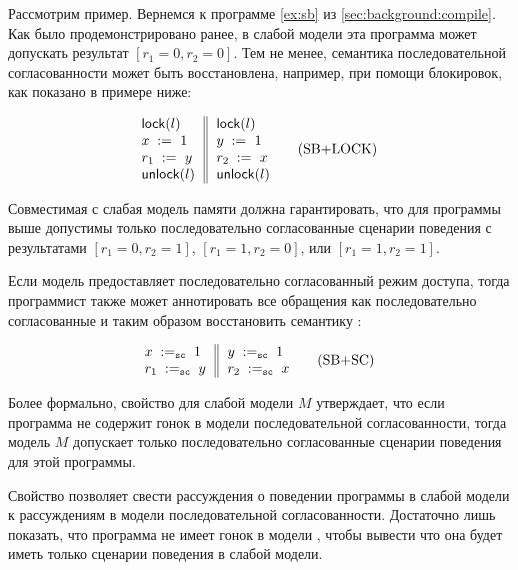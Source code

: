 Рассмотрим пример. 
Вернемся к программе \ref{ex:sb} из \cref{sec:background:compile}.
Как было продемонстрировано ранее, в слабой модели 
эта программа может допускать результат ${[r_1=0, r_2=0]}$.
Тем не менее, семантика последовательной согласованности
может быть восстановлена, например, при помощи блокировок, 
как показано в примере ниже:

\begin{equation*}
\inarrII{
   \lockInst{l}         \\
   \writeInst{}{x}{1}   \\
   \readInst{}{r_1}{y}  \\
   \unlockInst{l}       \\
}{
   \lockInst{l}         \\
   \writeInst{}{y}{1}   \\
   \readInst{}{r_2}{x}  \\
   \unlockInst{l}       \\
}
\tag{SB+LOCK}\label{ex:sb-lock}
\end{equation*}

Совместимая с \DRF слабая модель памяти должна гарантировать, 
что для программы выше допустимы только 
последовательно согласованные сценарии поведения с результатами
${[r_1=0, r_2=1]}$, ${[r_1=1,r_2=0]}$, или ${[r_1=1,r_2=1]}$.

Если модель предоставляет последовательно согласованный 
режим доступа, тогда программист также может 
аннотировать все обращения как последовательно согласованные
и таким образом восстановить семантику \SC:
 
\begin{equation*}
\inarrII{
   \writeInst{\sco}{x}{1}   \\
   \readInst{\sco}{r_1}{y}  \\
}{
   \writeInst{\sco}{y}{1}   \\
   \readInst{\sco}{r_2}{x}  \\
}
\tag{SB+SC}\label{ex:sb-sc}
\end{equation*}

Более формально, \DRF свойство для слабой модели $M$
утверждает, что если программа не содержит гонок в модели 
последовательной согласованности, тогда модель $M$
допускает только последовательно согласованные 
сценарии поведения для этой программы.

Свойство \DRF позволяет свести рассуждения о поведении программы 
в слабой модели к рассуждениям в модели последовательной согласованности.
Достаточно лишь показать, что программа не имеет гонок 
в модели \SC, чтобы вывести что она будет иметь только \SC 
сценарии поведения в слабой модели. 

